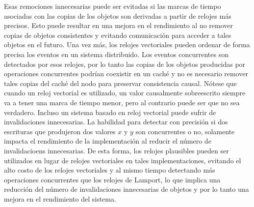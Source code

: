 \documentclass[12pt, times]{simauth}
\begin{document}
Esas remociones innecesarias puede ser evitadas si las marcas de tiempo asociadas con las copias de los objetos son derivadas a partir de relojes más precisos. Esto puede resultar en una mejora en el rendimiento al no remover copias de objetos consistentes y evitando comunicación para acceder a tales objetos en el futuro. Una vez más, los relojes vectoriales pueden ordenar de forma precisa los eventos en un sistema distribuido. Los eventos concurrentes son detectados por esos relojes, por lo tanto las copias de los objetos producidas por operaciones concurrentes podrían coexistir en un caché y no es necesario remover tales copias del caché del nodo para preservar consistencia causal. Nótese que cuando un reloj vectorial es utilizado, un valor causalmente sobreescrito siempre va a tener una marca de tiempo menor, pero al contrario puede ser que no sea verdadero. Incluso un sistema basado en reloj vectorial puede sufrir de invalidaciones innecesarias. La habilidad para detectar con precisión si dos escrituras que produjeron dos valores $x$ y $y$ son concurrentes o no, solamente impacta el rendimiento de la implementación al reducir el número de invalidacioens innecesarias. De esta forma, los relojes plausibles pueden ser utilizados en lugar de relojes vectoriales en tales implementaciones, evitando el alto costo de los relojes vectoriales y al mismo tiempo detectando más operaciones concurrentes que los relojes de Lamport, lo que implica una reducción del número de invalidaciones innecesarias de objetos y por lo tanto una mejora en el rendimiento del sistema.
\end{document}
